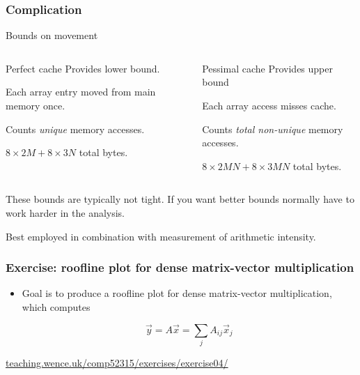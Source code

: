 \documentclass[presentation,aspectratio=43,10pt]{beamer}
\begin{document}
\begin{frame}
  \frametitle{Complication}
  \begin{answer}{Bounds on movement}
    \vspace{0.5\baselineskip}
    \begin{columns}[t]
      \begin{column}{0.45\textwidth}
        \begin{exampleblock}{Perfect cache}
          Provides lower bound.

          Each array entry moved from main memory once.

          Counts \emph{unique} memory accesses.

          $8\times 2M + 8\times 3N$ total bytes.
        \end{exampleblock}
      \end{column}
      \begin{column}{0.45\textwidth}
        \begin{challenge}{Pessimal cache}
          Provides upper bound

          Each array access misses cache.

          Counts \emph{total non-unique} memory accesses.

          $8 \times 2MN + 8\times 3MN$ total bytes.
        \end{challenge}
      \end{column}
    \end{columns}
  \end{answer}

  These bounds are typically not tight. If you want better bounds
  normally have to work harder in the analysis.

  Best employed in combination with measurement of arithmetic intensity.
\end{frame}
\begin{frame}
  \frametitle{Exercise: roofline plot for dense matrix-vector multiplication}
  \begin{itemize}
  \item Goal is to produce a roofline plot for dense matrix-vector
    multiplication, which computes

    \begin{equation*}
      \vec{y} = A \vec{x} = \sum_{j} A_{ij} \vec{x}_j
    \end{equation*}
  \end{itemize}
  \begin{center}
    \url{teaching.wence.uk/comp52315/exercises/exercise04/}
  \end{center}
\end{frame}
\end{document}
